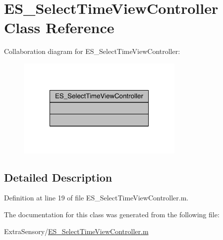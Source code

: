 \hypertarget{class_e_s___select_time_view_controller}{\section{E\+S\+\_\+\+Select\+Time\+View\+Controller Class Reference}
\label{class_e_s___select_time_view_controller}
}


Collaboration diagram for E\+S\+\_\+\+Select\+Time\+View\+Controller\+:\nopagebreak
\begin{figure}[H]
\begin{center}
\leavevmode
\includegraphics[width=228pt]{d8/d9a/class_e_s___select_time_view_controller__coll__graph}
\end{center}
\end{figure}


\subsection{Detailed Description}


Definition at line 19 of file E\+S\+\_\+\+Select\+Time\+View\+Controller.\+m.



The documentation for this class was generated from the following file\+:\begin{DoxyCompactItemize}
\item 
Extra\+Sensory/\hyperlink{_e_s___select_time_view_controller_8m}{E\+S\+\_\+\+Select\+Time\+View\+Controller.\+m}\end{DoxyCompactItemize}

